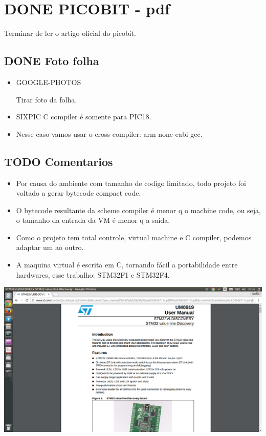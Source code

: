 \documentclass[11pt]{article}
\begin{document}
\section{{\bfseries\sffamily DONE} PICOBIT - pdf}
\label{sec-5}

Terminar de ler o artigo oficial do picobit.

\subsection{{\bfseries\sffamily DONE} Foto folha}
\label{sec-5-1}

\begin{itemize}
\item GOOGLE-PHOTOS

Tirar foto da folha.

\item SIXPIC C compiler é somente para PIC18.
\item Nesse caso vamos usar o cross-compiler: arm-none-eabi-gcc.
\end{itemize}

\subsection{{\bfseries\sffamily TODO} Comentarios}
\label{sec-5-2}

\begin{itemize}
\item Por causa do ambiente com tamanho de codigo limitado, todo projeto foi voltado a gerar bytecode compact code.
\item O bytecode resultante da scheme compiler é menor q o machine code, ou seja, o tamanho da entrada da VM é menor q a saída.
\item Como o projeto tem total controle, virtual machine e C compiler, podemos adaptar um ao outro.
\item A maquina virtual é escrita em C, tornando fácil a portabilidade entre hardwares, esse trabalho: STM32F1 e STM32F4.
\end{itemize}

\includegraphics[width=.9\linewidth]{stm32f1.png}
\end{document}

